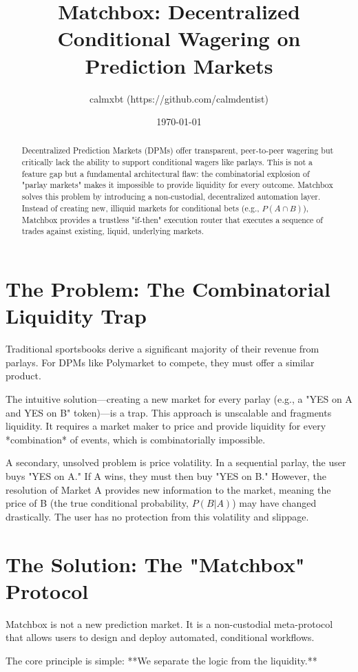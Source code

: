 \documentclass[11pt, a4paper]{article}
\title{Matchbox: Decentralized Conditional Wagering on Prediction Markets}
\author{calmxbt (https://github.com/calmdentist)}
\date{\today}
\begin{document}
\maketitle

\begin{abstract}
\noindent
Decentralized Prediction Markets (DPMs) offer transparent, peer-to-peer wagering but critically lack the ability to support conditional wagers like parlays. This is not a feature gap but a fundamental architectural flaw: the combinatorial explosion of "parlay markets" makes it impossible to provide liquidity for every outcome. Matchbox solves this problem by introducing a non-custodial, decentralized automation layer. Instead of creating new, illiquid markets for conditional bets (e.g., $P(A \cap B)$), Matchbox provides a trustless "if-then" execution router that executes a sequence of trades against existing, liquid, underlying markets.
\end{abstract}

\section{The Problem: The Combinatorial Liquidity Trap}
Traditional sportsbooks derive a significant majority of their revenue from parlays. For DPMs like Polymarket to compete, they must offer a similar product.

The intuitive solution—creating a new market for every parlay (e.g., a "YES on A and YES on B" token)—is a trap. This approach is unscalable and fragments liquidity. It requires a market maker to price and provide liquidity for every *combination* of events, which is combinatorially impossible.

A secondary, unsolved problem is price volatility. In a sequential parlay, the user buys "YES on A." If A wins, they must then buy "YES on B." However, the resolution of Market A provides new information to the market, meaning the price of B (the true conditional probability, $P(B|A)$) may have changed drastically. The user has no protection from this volatility and slippage.

\section{The Solution: The "Matchbox" Protocol}
Matchbox is not a new prediction market. It is a non-custodial meta-protocol that allows users to design and deploy automated, conditional workflows.

The core principle is simple: **We separate the logic from the liquidity.**
\end{document}
